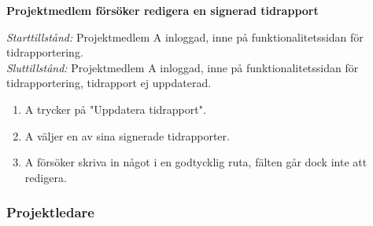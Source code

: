 \documentclass[a4paper]{article}
\begin{document}
\begin{FT}
\item
\textbf{Projektmedlem försöker redigera en signerad tidrapport}

\emph{Starttillstånd:} Projektmedlem A inloggad, inne på funktionalitetssidan för tidrapportering.\\
\emph{Sluttillstånd:} Projektmedlem A inloggad, inne på funktionalitetssidan för tidrapportering, tidrapport ej uppdaterad.

\begin{enumerate}
\item A trycker på "Uppdatera tidrapport".
\item A väljer en av sina signerade tidrapporter.
\item A försöker skriva in något i en godtycklig ruta, fälten går dock inte att redigera.
\end{enumerate}

\end{FT}

\subsubsection{Projektledare}
\end{document}
